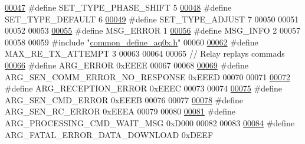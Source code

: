 \begin{DoxyCode}
\hypertarget{a00034_source_l00047}{}\hyperlink{a00034_ada31d976cd5e22a05ba8ff5e80c16d06}{00047} \textcolor{preprocessor}{#define SET\_TYPE\_PHASE\_SHIFT                                    5}
\hypertarget{a00034_source_l00048}{}\hyperlink{a00034_afd1036bf6329d2ac31913e14c1f56725}{00048} \textcolor{preprocessor}{#define SET\_TYPE\_DEFAULT                                        6}
\hypertarget{a00034_source_l00049}{}\hyperlink{a00034_a16b6b7b5ad68ec0dd62a3c9e97f88adb}{00049} \textcolor{preprocessor}{#define SET\_TYPE\_ADJUST                                         7}
00050 
00051 
00052 
00053 
\hypertarget{a00034_source_l00055}{}\hyperlink{a00034_aa8a990825a5a62c89d2fb8b08d8a1070}{00055} \textcolor{preprocessor}{#define MSG\_ERROR                                   1}
\hypertarget{a00034_source_l00056}{}\hyperlink{a00034_a1ddcc97224a95cec04b38b0ac866fa19}{00056} \textcolor{preprocessor}{#define MSG\_INFO                                    2}
00057 
00058 
00059 \textcolor{preprocessor}{#include "\hyperlink{a00031}{common\_define\_aq0x.h}"}
00060 
\hypertarget{a00034_source_l00062}{}\hyperlink{a00034_ae024113875b4670b57f70611ff982543}{00062} \textcolor{preprocessor}{#define MAX\_RE\_TX\_ATTEMPT                         3}
00063 
00064 
00065 \textcolor{comment}{// Relay replays commads}
\hypertarget{a00034_source_l00066}{}\hyperlink{a00034_a098c8517207326db0313f33ac7c6fdd8}{00066} \textcolor{preprocessor}{#define ARG\_ERROR                                   0xEEEE}
00067 
00068 
\hypertarget{a00034_source_l00069}{}\hyperlink{a00034_a5f745a08fe4d5a8336a8fd62c30e0642}{00069} \textcolor{preprocessor}{#define ARG\_SEN\_COMM\_ERROR\_NO\_RESPONSE              0xEEED}
00070 
00071 
\hypertarget{a00034_source_l00072}{}\hyperlink{a00034_a6c0eafe3de1c9e7ecff5c4f93db9ab7b}{00072} \textcolor{preprocessor}{#define ARG\_RECEPTION\_ERROR                         0xEEEC}
00073 
00074 
\hypertarget{a00034_source_l00075}{}\hyperlink{a00034_a9922eac72168ff3c8ee0b273de724049}{00075} \textcolor{preprocessor}{#define ARG\_SEN\_CMD\_ERROR                           0xEEEB}
00076 
00077 
\hypertarget{a00034_source_l00078}{}\hyperlink{a00034_a2663000c914acad476f44813681c6b5e}{00078} \textcolor{preprocessor}{#define ARG\_SEN\_RC\_ERROR                            0xEEEA}
00079 
00080 
\hypertarget{a00034_source_l00081}{}\hyperlink{a00034_a89228259ebf351e938853637ef163a1b}{00081} \textcolor{preprocessor}{#define ARG\_PROCESSING\_CMD\_WAIT\_MSG                 0xD000}
00082 
00083 
\hypertarget{a00034_source_l00084}{}\hyperlink{a00034_aedd62437ce5e337b31be5ae516039725}{00084} \textcolor{preprocessor}{#define ARG\_FATAL\_ERROR\_DATA\_DOWNLOAD               0xDEEF}

\end{DoxyCode}
